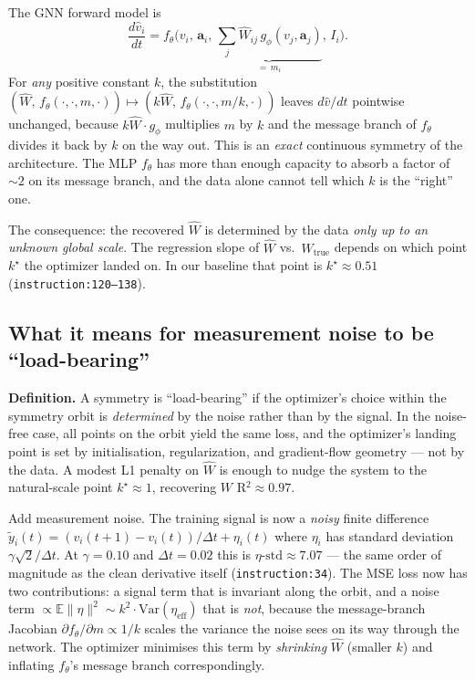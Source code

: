 \documentclass[11pt]{article}
\begin{document}
The GNN forward model is
\[
\frac{d\hat v_i}{dt} = f_\theta\!\Big(v_i,\, \mathbf{a}_i,\,
\underbrace{\textstyle\sum_j \widehat W_{ij}\, g_\phi(v_j,\mathbf{a}_j)}_{=\,m_i},\,
I_i\Big).
\]
For \emph{any} positive constant $k$, the substitution
$(\widehat W,\, f_\theta(\cdot,\cdot,m,\cdot)) \mapsto (k\widehat W,\, f_\theta(\cdot,\cdot,m/k,\cdot))$
leaves $d\hat v/dt$ pointwise unchanged, because $k\widehat W \cdot g_\phi$
multiplies $m$ by $k$ and the message branch of $f_\theta$ divides it back by $k$
on the way out. This is an \emph{exact} continuous symmetry of the
architecture. The MLP $f_\theta$ has more than enough capacity to absorb a
factor of $\sim 2$ on its message branch, and the data alone cannot tell which
$k$ is the ``right'' one.

The consequence: the recovered $\widehat W$ is determined by the data
\emph{only up to an unknown global scale}. The regression slope of
$\widehat W$ vs.\ $W_{\text{true}}$ depends on which point $k^\star$ the
optimizer landed on. In our baseline that point is $k^\star \approx 0.51$
(\texttt{instruction:120--138}).

\subsection{What it means for measurement noise to be ``load-bearing''}

\textbf{Definition.} A symmetry is ``load-bearing'' if the optimizer's choice
within the symmetry orbit is \emph{determined} by the noise rather than by the
signal. In the noise-free case, all points on the orbit yield the same loss,
and the optimizer's landing point is set by initialisation, regularization,
and gradient-flow geometry --- not by the data. A modest L1 penalty on
$\widehat W$ is enough to nudge the system to the natural-scale point
$k^\star \approx 1$, recovering $W$ R$^2 \approx 0.97$.

Add measurement noise. The training signal is now a \emph{noisy} finite
difference $\widetilde y_i(t) = (v_i(t{+}1) - v_i(t))/\Delta t + \eta_i(t)$
where $\eta_i$ has standard deviation $\gamma\sqrt{2}/\Delta t$. At
$\gamma=0.10$ and $\Delta t = 0.02$ this is $\eta\text{-std} \approx 7.07$ ---
the same order of magnitude as the clean derivative itself
(\texttt{instruction:34}). The MSE loss now has two contributions:
a signal term that is invariant along the orbit, and a noise term
$\propto \mathbb E\|\eta\|^2 \sim k^2 \cdot \mathrm{Var}(\eta_{\text{eff}})$
that is \emph{not}, because the message-branch Jacobian
$\partial f_\theta / \partial m \propto 1/k$ scales the variance the noise sees
on its way through the network. The optimizer minimises this term by
\emph{shrinking} $\widehat W$ (smaller $k$) and inflating $f_\theta$'s
message branch correspondingly.
\end{document}
